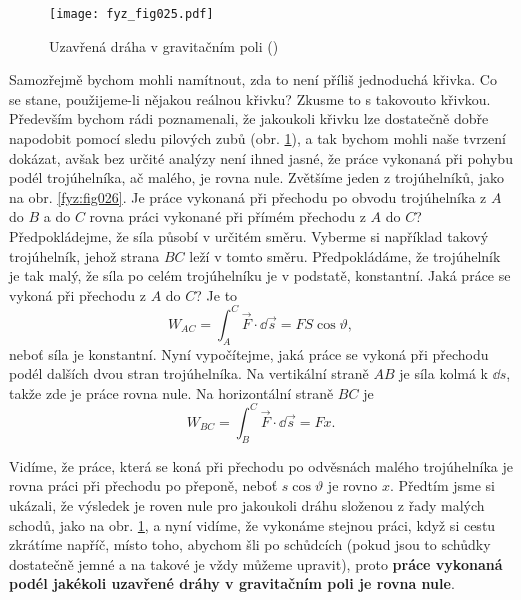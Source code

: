{    \begin{figure}[ht!]  %
      \centering
      \texttt{[image: fyz\_fig025.pdf]}
      \caption{Uzavřená dráha v gravitačním poli (\cite[s.~190]{Feynman01})}
      \label{fyz:fig025}
    \end{figure}
    Samozřejmě bychom mohli namítnout, zda to není příliš jednoduchá křivka. Co se stane, 
    použijeme-li nějakou reálnou křivku? Zkusme to s takovouto křivkou. Především bychom rádi 
    poznamenali, že jakoukoli křivku lze dostatečně dobře napodobit pomocí sledu pilových zubů 
    (obr. \ref{fyz:fig025}), a tak bychom mohli naše tvrzení dokázat, avšak bez určité analýzy není 
    ihned jasné, že práce vykonaná při pohybu podél trojúhelníka, ač malého, je rovna nule. 
    Zvětšíme jeden z trojúhelníků, jako na obr. \ref{fyz:fig026}. Je práce vykonaná při přechodu po 
    obvodu trojúhelníka z \(A\) do \(B\) a do \(C\) rovna práci vykonané při přímém přechodu z 
    \(A\) do \(C\)? Předpokládejme, že síla působí v určitém směru. Vyberme si například takový 
    trojúhelník, jehož strana \(BC\) leží v tomto směru. Předpokládáme, že trojúhelník je tak malý, 
    že síla po celém trojúhelníku je v podstatě, konstantní. Jaká práce se vykoná při přechodu z 
    \(A\) do \(C\)? Je to
    \begin{equation*}
      W_{AC} = \int_A^C\vec{F}\cdot\dd{\vec{s}} = FS\cos\vartheta,
    \end{equation*} 
    neboť síla je konstantní. Nyní vypočítejme, jaká práce se vykoná při přechodu podél dalších 
    dvou stran trojúhelníka. Na vertikální straně \(AB\) je síla kolmá k \(\dd{s}\), takže zde je 
    práce rovna nule. Na horizontální straně \(BC\) je
    \begin{equation}\label{FYZ:eq044}
      W_{BC} = \int_B^C\vec{F}\cdot\dd{\vec{s}} = Fx.
    \end{equation} 

    Vidíme, že práce, která se koná při přechodu po odvěsnách malého trojúhelníka je rovna práci 
    při přechodu po přeponě, neboť \(s\cos\vartheta\) je rovno \(x\). Předtím jsme si ukázali, že 
    výsledek je roven nule pro jakoukoli dráhu složenou z řady malých schodů, jako na obr. 
    \ref{fyz:fig025}, a nyní vidíme, že vykonáme stejnou práci, když si cestu zkrátíme napříč, 
    místo toho, abychom šli po schůdcích (pokud jsou to schůdky dostatečně jemné a na takové je 
    vždy můžeme upravit), proto \textbf{práce vykonaná podél jakékoli uzavřené dráhy v gravitačním 
    poli je rovna nule}.
    
}
